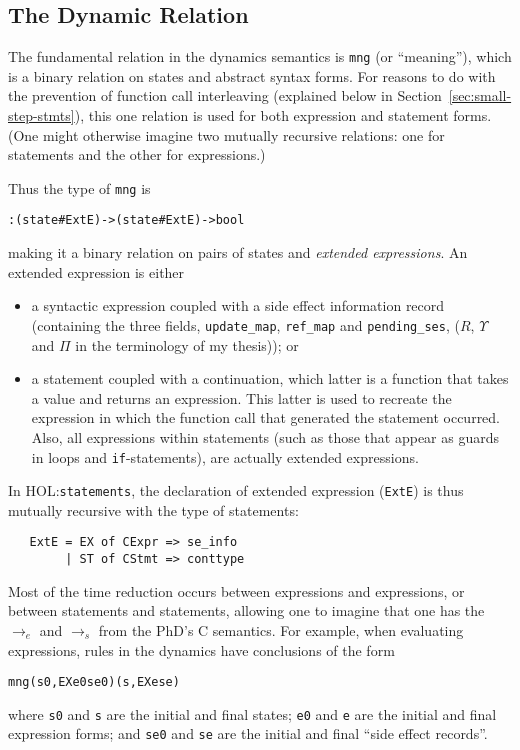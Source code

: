 \documentclass[11pt]{article}
\newcommand{\HOLfile}[1]{HOL:\texttt{#1}}
\begin{document}
\subsection{The Dynamic Relation}

\newcommand{\mng}{\texttt{mng}}

The fundamental relation in the dynamics semantics is \mng{} (or
``meaning''), which is a binary relation on states and abstract syntax
forms.  For reasons to do with the prevention of function call
interleaving (explained below in Section~\ref{sec:small-step-stmts}),
this one relation is used for both expression and statement forms.
(One might otherwise imagine two mutually recursive relations: one for
statements and the other for expressions.)

Thus the type of \mng{} is
\begin{alltt}
   : (state # ExtE) -> (state # ExtE) -> bool
\end{alltt}
making it a binary relation on pairs of states and \emph{extended
  expressions}.  An extended expression is either
\begin{itemize}
\item a syntactic expression coupled with a side effect information
  record (containing the three fields, \texttt{update\_map},
  \texttt{ref\_map} and \texttt{pending\_ses}, ($R$, $\Upsilon$ and
  $\Pi$ in the terminology of my thesis)); or
\item a statement coupled with a continuation, which latter is a
  function that takes a value and returns an expression.  This latter
  is used to recreate the expression in which the function call
  that generated the statement occurred.  Also, all expressions within
  statements (such as those that appear as guards in loops and
  \texttt{if}-statements), are actually extended expressions.
\end{itemize}

In \HOLfile{statements}, the declaration of extended expression
(\texttt{ExtE}) is thus mutually recursive with the type of
statements:
\begin{verbatim}
   ExtE = EX of CExpr => se_info
        | ST of CStmt => conttype
\end{verbatim}

Most of the time reduction occurs between expressions and expressions,
or between statements and statements, allowing one to imagine that one
has the $\rightarrow_e$ and $\rightarrow_s$ from the PhD's C
semantics.  For example, when evaluating expressions, rules in the
dynamics have conclusions of the form
\begin{alltt}
   mng (s0, EX e0 se0) (s, EX e se)
\end{alltt}
where \texttt{s0} and \texttt{s} are the initial and final states;
\texttt{e0} and \texttt{e} are the initial and final expression forms;
and \texttt{se0} and \texttt{se} are the initial and final ``side
effect records''.
\end{document}
